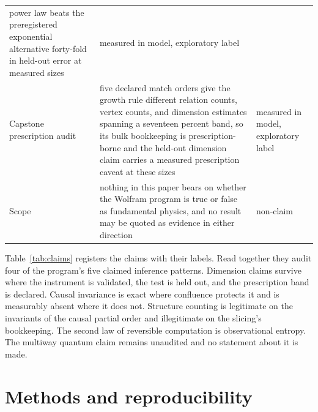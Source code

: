 \documentclass[aps,pre,reprint,nofootinbib]{revtex4-2}
\begin{document}
\begin{table}[t]
\begin{ruledtabular}
\begin{tabular}{L{4.6cm} L{9.2cm} l}
power law beats the preregistered exponential alternative forty-fold
in held-out error at measured sizes & measured in model, exploratory label \\
Capstone prescription audit & five declared match orders give the
growth rule different relation counts, vertex counts, and dimension
estimates spanning a seventeen percent band, so its bulk bookkeeping
is prescription-borne and the held-out dimension claim carries a
measured prescription caveat at these sizes & measured in model, exploratory label \\
Scope & nothing in this paper bears on whether the Wolfram program is
true or false as fundamental physics, and no result may be quoted as
evidence in either direction & non-claim \\
\end{tabular}
\end{ruledtabular}
\end{table}

Table~\ref{tab:claims} registers the claims with their labels.  Read
together they audit four of the program's five claimed inference
patterns.  Dimension claims survive where the instrument is validated,
the test is held out, and the prescription band is declared.  Causal
invariance is exact where confluence protects it and is measurably
absent where it does not.  Structure counting is legitimate on the
invariants of the causal partial order and illegitimate on the
slicing's bookkeeping.  The second law of reversible computation is
observational entropy.  The multiway quantum claim remains unaudited
and no statement about it is made.

\section{Methods and reproducibility}
\label{sec:methods}
\end{document}
